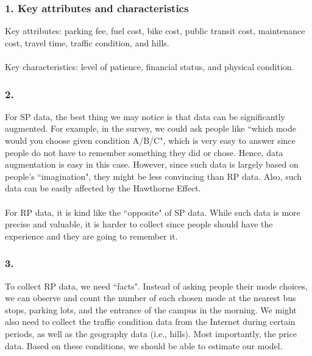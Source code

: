\documentclass[11pt]{article}
\begin{document}
\subsubsection*{1. Key attributes and characteristics}
Key attributes: parking fee, fuel cost, bike cost, public transit cost, maintenance cost, travel time, traffic condition, and hills.\\\\
Key characteristics: level of patience, financial status, and physical condition.
\newpage
\subsubsection*{2.}
For SP data, the best thing we may notice is that data can be significantly augmented. For example, in the survey, we could ask people like ``which mode would you choose given condition A/B/C", which is very easy to answer since people do not have to remember something they did or chose. Hence, data augmentation is easy in this case. However, since such data is largely based on people's ``imagination", they might be less convincing than RP data. Also, such data can be easily affected by the Hawthorne Effect.\\\\
For RP data, it is kind like the ``opposite" of SP data. While such data is more precise and valuable, it is harder to collect since people should have the experience and they are going to remember it.  
\subsubsection*{3.}
To collect RP data, we need ``facts". Instead of asking people their mode choices, we can observe and count the number of each chosen mode at the nearest bus stops, parking lots, and the entrance of the campus in the morning. We might also need to collect the traffic condition data from the Internet during certain periods, as well as the geography data (i.e., hills). Most importantly, the price data. Based on these conditions, we should be able to estimate our model. 
\end{document}
